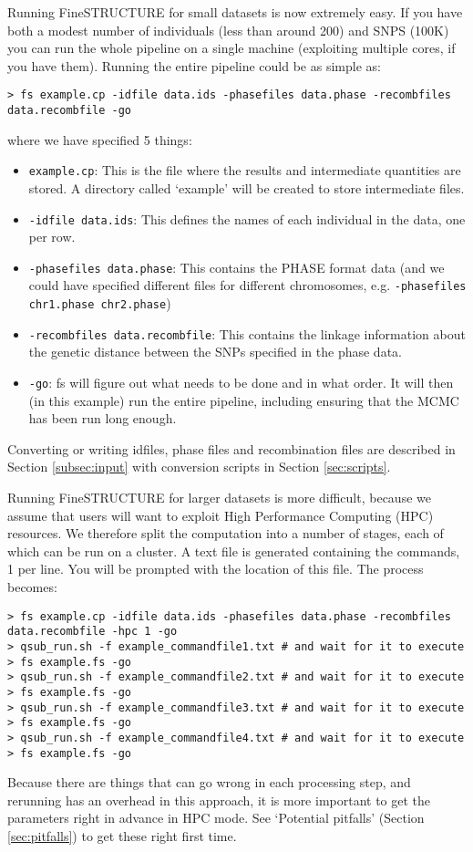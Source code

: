 \documentclass[11pt]{article}
\begin{document}
Running FineSTRUCTURE for small datasets is now extremely easy. If you have both a modest number of individuals (less than around 200) and SNPS (100K) you can run the whole pipeline on a single machine (exploiting multiple cores, if you have them). Running the entire pipeline could be as simple as:
\begin{lstlisting}[caption=Simple example)]
> fs example.cp -idfile data.ids -phasefiles data.phase -recombfiles data.recombfile -go
\end{lstlisting}
where we have specified 5 things:
\begin{itemize}
\item \verb!example.cp!: This is the file where the results and intermediate quantities are stored. A directory called `example' will be created to store intermediate files.
\item \verb!-idfile data.ids!: This defines the names of each individual in the data, one per row. 
\item \verb!-phasefiles data.phase!: This contains the PHASE format data (and we could have specified different files for different chromosomes, e.g. \verb!-phasefiles chr1.phase chr2.phase!)
\item \verb!-recombfiles data.recombfile!: This contains the linkage information about the genetic distance between the SNPs specified in the phase data.
\item \verb!-go!: fs will figure out what needs to be done and in what order. It will then (in this example) run the entire pipeline, including ensuring that the MCMC has been run long enough.
\end{itemize}
Converting or writing idfiles, phase files and recombination files are described in Section \ref{subsec:input} with conversion scripts in Section \ref{sec:scripts}.

Running FineSTRUCTURE for larger datasets is more difficult, because we assume that users will want to exploit High Performance Computing (HPC) resources. We therefore split the computation into a number of stages, each of which can be run on a cluster. A text file is generated containing the commands, 1 per line. You will be prompted with the location of this file.  The process becomes:
\begin{lstlisting}[caption=HPC example)]
> fs example.cp -idfile data.ids -phasefiles data.phase -recombfiles data.recombfile -hpc 1 -go
> qsub_run.sh -f example_commandfile1.txt # and wait for it to execute
> fs example.fs -go
> qsub_run.sh -f example_commandfile2.txt # and wait for it to execute
> fs example.fs -go
> qsub_run.sh -f example_commandfile3.txt # and wait for it to execute
> fs example.fs -go
> qsub_run.sh -f example_commandfile4.txt # and wait for it to execute
> fs example.fs -go
\end{lstlisting}
Because there are things that can go wrong in each processing step, and rerunning has an overhead in this approach, it is more important to get the parameters right in advance in HPC mode. See `Potential pitfalls' (Section \ref{sec:pitfalls}) to get these right first time.
\end{document}
